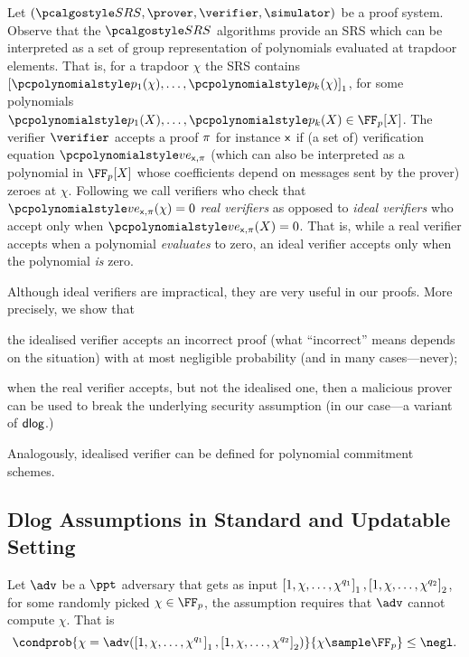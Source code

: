  Let
$(\SRScer, \prover, \verifier, \simulator)$ be a proof system.
Observe that the $\SRScer$ algorithms provide an SRS which can be interpreted as a set
of group representation of polynomials evaluated at trapdoor elements. That is, for a
trapdoor $\chi$ the SRS contains $\gone{\p{p_1}(\chi), \ldots, \p{p_k}(\chi)}$, for
some polynomials $\p{p_1}(X), \ldots, \p{p_k}(X) \in \FF_p[X]$. The verifier
$\verifier$ accepts a proof $\pi$ for instance $\mathsf{x}$ if (a set of) verification
equation $\vereq_{\inp, \zkproof}$ (which can also be interpreted as a polynomial in
$\FF_p[X]$ whose coefficients depend on messages sent by the prover) zeroes at
$\chi$. Following \cite{EPRINT:GabWilCio19} we call verifiers who check that
$\vereq_{\inp, \zkproof}(\chi) = 0$ \emph{real verifiers} as opposed to \emph{ideal
  verifiers} who accept only when $\vereq_{\inp, \zkproof}(X) = 0$. That is, while a
real verifier accepts when a polynomial \emph{evaluates} to zero, an ideal verifier
accepts only when the polynomial \emph{is} zero.

Although ideal verifiers are impractical, they are very useful in our
proofs. More precisely, we show that
\begin{compactenum}
\item the idealised verifier accepts an incorrect proof (what ``incorrect''
  means depends on the situation) with at most negligible probability (and in many
  cases---never);
\item when the real verifier accepts, but not the idealised one, then a malicious
  prover can be used to break the underlying security assumption (in our case---a
  variant of $\mathsf{dlog}$.)
\end{compactenum}

Analogously, idealised verifier can be defined for polynomial commitment schemes.

\subsection{Dlog Assumptions in Standard and Updatable Setting}
\label{dlog-upd}
\label{sec:udlog_assumptions}


\label{sec:dlog_assumptions}
\begin{definition}\label{def:dlog}
	Let $\adv$ be a $\ppt$ adversary that gets as input
  $\left[1, \chi, \ldots, \chi^{q_1}\right]_{1}, \left[1, \chi, \ldots, \chi^{q_2}\right]_{2}$, for
  some randomly picked $\chi \in \FF_p$, the assumption requires that $\adv$ cannot compute $\chi$. That is
	\[
		\condprob{\chi = \adv(\gone{1, \chi, \ldots, \chi^{q_1}}, \gtwo{1, \chi,
        \ldots, \chi^{q_2} })}{\chi \sample \FF_p} \leq \negl.
	\]
\end{definition}

